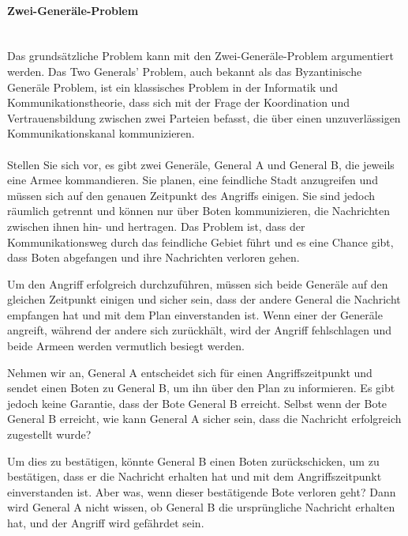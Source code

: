 \documentclass[../vs-script-first-v01.tex]{subfiles}
\begin{document}
\paragraph{Zwei-Generäle-Problem \\\\}
Das grundsätzliche Problem kann mit den Zwei-Generäle-Problem argumentiert werden. Das Two Generals' Problem, auch bekannt als das Byzantinische Generäle Problem, ist ein klassisches Problem in der Informatik und Kommunikationstheorie, dass sich mit der Frage der Koordination und Vertrauensbildung zwischen zwei Parteien befasst, die über einen unzuverlässigen Kommunikationskanal kommunizieren.
\\\\
Stellen Sie sich vor, es gibt zwei Generäle, General A und General B, die jeweils eine Armee kommandieren. Sie planen, eine feindliche Stadt anzugreifen und müssen sich auf den genauen Zeitpunkt des Angriffs einigen. Sie sind jedoch räumlich getrennt und können nur über Boten kommunizieren, die Nachrichten zwischen ihnen hin- und hertragen. Das Problem ist, dass der Kommunikationsweg durch das feindliche Gebiet führt und es eine Chance gibt, dass Boten abgefangen und ihre Nachrichten verloren gehen.

Um den Angriff erfolgreich durchzuführen, müssen sich beide Generäle auf den gleichen Zeitpunkt einigen und sicher sein, dass der andere General die Nachricht empfangen hat und mit dem Plan einverstanden ist. Wenn einer der Generäle angreift, während der andere sich zurückhält, wird der Angriff fehlschlagen und beide Armeen werden vermutlich besiegt werden.

Nehmen wir an, General A entscheidet sich für einen Angriffszeitpunkt und sendet einen Boten zu General B, um ihn über den Plan zu informieren. Es gibt jedoch keine Garantie, dass der Bote General B erreicht. Selbst wenn der Bote General B erreicht, wie kann General A sicher sein, dass die Nachricht erfolgreich zugestellt wurde?

Um dies zu bestätigen, könnte General B einen Boten zurückschicken, um zu bestätigen, dass er die Nachricht erhalten hat und mit dem Angriffszeitpunkt einverstanden ist. Aber was, wenn dieser bestätigende Bote verloren geht? Dann wird General A nicht wissen, ob General B die ursprüngliche Nachricht erhalten hat, und der Angriff wird gefährdet sein.
\end{document}
